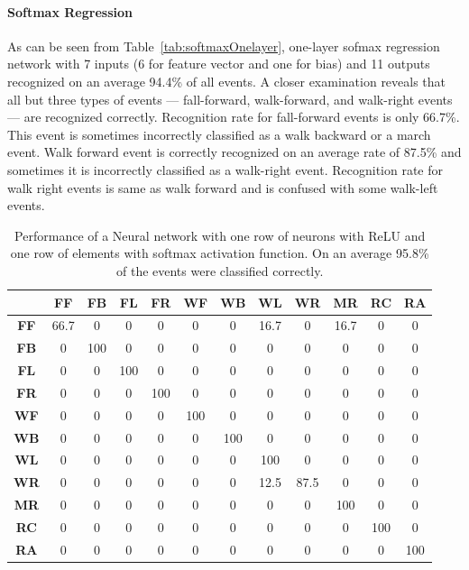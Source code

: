 \documentclass[]{IEEEtran}
\begin{document}
 \paragraph{Softmax Regression}
 \label{sec:SoftmaxRegression}
 As can be seen from Table~\ref{tab:softmaxOnelayer}, one-layer sofmax regression network with 7 inputs (6 for feature vector and one for bias) and 11 outputs recognized on an average 94.4\% of all  events. A closer examination reveals that all but three types of events --- fall-forward, walk-forward, and walk-right events  --- are recognized correctly. Recognition rate for fall-forward events is only 66.7\%. This event is sometimes  incorrectly classified as a 
walk backward or a march event. Walk forward event is correctly recognized on an average rate of 87.5\% and sometimes it is incorrectly classified as a walk-right event. Recognition rate for walk right events is same as walk forward and is confused with  some  walk-left events.
\begin{table}[htb]
\caption{Performance of a Neural network with one row of neurons with ReLU and one row of elements with softmax activation function. On an average 95.8\% of the events were classified correctly.}
\label{tbl:neuralNetworkOneLayer}
\resizebox{\columnwidth}{!}
{
\begin{tabular}{|c|c|c|c|c|c|c|c|c|c|c|c|}
\hline 
& \textbf{FF} & \textbf{FB}  & \textbf{FL} & \textbf{FR} &  \textbf{WF} & 
\textbf{WB} & \textbf{WL} & \textbf{WR} & \textbf{MR} & 
\textbf{RC} & \textbf{RA} \\ \hline
\textbf{FF} & 66.7 &  0 &  0 &  0 &  0 &  0 &  16.7 &  0 &  16.7 &  0 &  0 \\ \hline
\textbf{FB} & 0 &  100 &  0 &  0 &  0 &  0 &  0 &  0 &  0 &  0 &  0 \\ \hline
\textbf{FL} & 0 &  0 &  100 &  0 &  0 &  0 &  0 &  0 &  0 &  0 &  0 \\ \hline
\textbf{FR} & 0 &  0 &  0 &  100 &  0 &  0 &  0 &  0 &  0 &  0 &  0 \\ \hline
\textbf{WF} & 0 &  0 &  0 &  0 &  100 &  0 &  0 &  0 &  0 &  0 &  0 \\ \hline
\textbf{WB} & 0 &  0 &  0 &  0 &  0 &  100 &  0 &  0 &  0 &  0 &  0 \\ \hline
\textbf{WL} & 0 &  0 &  0 &  0 &  0 &  0 &  100 &  0 &  0 &  0 &  0 \\ \hline
\textbf{WR} & 0 &  0 &  0 &  0 &  0 &  0 &  12.5 &  87.5 &  0 &  0 &  0 \\ \hline
\textbf{MR} & 0 &  0 &  0 &  0 &  0 &  0 &  0 &  0 &  100 &  0 &  0 \\ \hline
\textbf{RC} & 0 &  0 &  0 &  0 &  0 &  0 &  0 &  0 &  0 &  100 &  0 \\ \hline
\textbf{RA} & 0 &  0 &  0 &  0 &  0 &  0 &  0 &  0 &  0 &  0 &  100 \\ \hline
\end{tabular}
}
\end{table}
\end{document}
